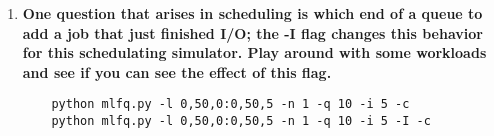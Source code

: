\documentclass{article}
\begin{document}
\begin{enumerate}
    \item \textbf{One question that arises in scheduling is which end of a queue to add a job that just finished I/O; the -I flag changes this behavior for this schedulating simulator. Play around with some workloads and see if you can see the effect of this flag.}
    \begin{verbatim}
    python mlfq.py -l 0,50,0:0,50,5 -n 1 -q 10 -i 5 -c
    python mlfq.py -l 0,50,0:0,50,5 -n 1 -q 10 -i 5 -I -c
    \end{verbatim}
    
\end{enumerate}
\end{document}
